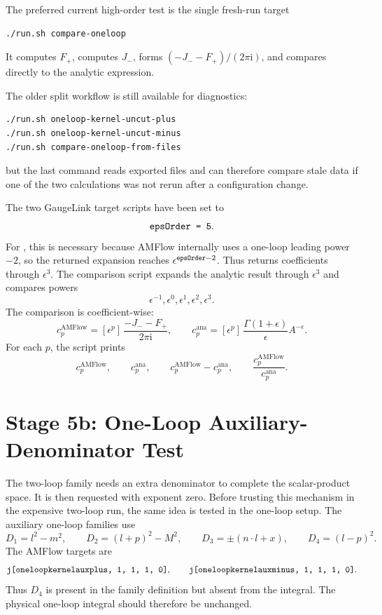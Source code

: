 \documentclass[11pt]{article}
\newcommand{\ii}{\mathrm{i}}
\newcommand{\eps}{\epsilon}
\newcommand{\WL}[1]{\texttt{\detokenize{#1}}}
\begin{document}
The preferred current high-order test is the single fresh-run target
\begin{verbatim}
./run.sh compare-oneloop
\end{verbatim}
It computes \(F_+\), computes \(J_-\), forms
\((-J_--F_+)/(2\pi\ii)\), and compares directly to the analytic expression.

The older split workflow is still available for diagnostics:
\begin{verbatim}
./run.sh oneloop-kernel-uncut-plus
./run.sh oneloop-kernel-uncut-minus
./run.sh compare-oneloop-from-files
\end{verbatim}
but the last command reads exported files and can therefore compare stale data
if one of the two calculations was not rerun after a configuration change.

The two GaugeLink target scripts have been set to
\begin{equation}
  \WL{epsOrder = 5}.
\end{equation}
For \WL{SolveIntegralsGaugeLink}, this is necessary because AMFlow internally
uses a one-loop leading power \(-2\), so the returned expansion reaches
\(\eps^{\WL{epsOrder}-2}\). Thus \WL{epsOrder = 5} returns coefficients
through \(\eps^3\). The comparison script expands the analytic result through
\(\eps^3\) and compares powers
\begin{equation}
  \eps^{-1},\eps^0,\eps^1,\eps^2,\eps^3.
\end{equation}
The comparison is coefficient-wise:
\begin{equation}
  c_p^{\mathrm{AMFlow}}
  =
  [\eps^p]\,
  \frac{-J_--F_+}{2\pi\ii},
  \qquad
  c_p^{\mathrm{ana}}
  =
  [\eps^p]\,
  \frac{\Gamma(1+\eps)}{\eps}A^{-\eps}.
\end{equation}
For each \(p\), the script prints
\begin{equation}
  c_p^{\mathrm{AMFlow}},\qquad
  c_p^{\mathrm{ana}},\qquad
  c_p^{\mathrm{AMFlow}}-c_p^{\mathrm{ana}},\qquad
  \frac{c_p^{\mathrm{AMFlow}}}{c_p^{\mathrm{ana}}}.
\end{equation}

\section{Stage 5b: One-Loop Auxiliary-Denominator Test}

The two-loop family needs an extra denominator to complete the scalar-product
space. It is then requested with exponent zero. Before trusting this mechanism
in the expensive two-loop run, the same idea is tested in the one-loop setup.
The auxiliary one-loop families use
\begin{equation}
  D_1=l^2-m^2,\qquad
  D_2=(l+p)^2-M^2,\qquad
  D_3=\pm(n\cdot l+x),\qquad
  D_4=(l-p)^2.
\end{equation}
The AMFlow targets are
\begin{equation}
  \WL{j[oneloopkernelauxplus, 1, 1, 1, 0]},
  \qquad
  \WL{j[oneloopkernelauxminus, 1, 1, 1, 0]}.
\end{equation}
Thus \(D_4\) is present in the family definition but absent from the integral.
The physical one-loop integral should therefore be unchanged.
\end{document}
